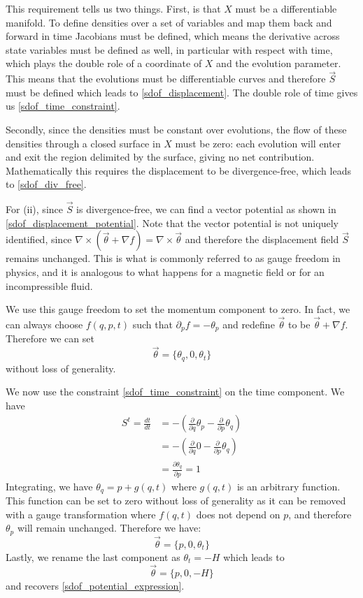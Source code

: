 \documentclass[10pt,twocolumn, nofootinbib]{revtex4-2}
\begin{document}
This requirement tells us two things. First, is that $X$ must be a differentiable manifold. To define densities over a set of variables and map them back and forward in time Jacobians must be defined, which means the derivative across state variables must be defined as well, in particular with respect with time, which plays the double role of a coordinate of $X$ and the evolution parameter. This means that the evolutions must be differentiable curves and therefore $\vec{S}$ must be defined which leads to \ref{sdof_displacement}. The double role of time gives us \ref{sdof_time_constraint}.

Secondly, since the densities must be constant over evolutions, the flow of these densities through a closed surface in $X$ must be zero: each evolution will enter and exit the region delimited by the surface, giving no net contribution. Mathematically this requires the displacement to be divergence-free, which leads to \ref{sdof_div_free}.

For (ii), since $\vec{S}$ is divergence-free, we can find a vector potential as shown in \ref{sdof_displacement_potential}. Note that the vector potential is not uniquely identified, since $\nabla \times(\vec{\theta} + \nabla f) = \nabla \times \vec{\theta}$ and therefore the displacement field $\vec{S}$ remains unchanged. This is what is commonly referred to as gauge freedom in physics, and it is analogous to what happens for a magnetic field or for an incompressible fluid.

We use this gauge freedom to set the momentum component to zero. In fact, we can always choose $f(q,p,t)$ such that $\partial_p f = -\theta_p$ and redefine $\vec{\theta}$ to be $\vec{\theta} + \nabla f$. Therefore we can set
\begin{equation*}
	\vec{\theta} = \{\theta_q, 0, \theta_t\}
\end{equation*}
without loss of generality.

We now use the constraint \ref{sdof_time_constraint} on the time component. We have
\begin{align*}
	S^t = \frac{dt}{dt} &= - \left(\frac{\partial}{\partial q}  \theta_p - \frac{\partial}{\partial p}  \theta_q\right) \\
	&= - \left(\frac{\partial}{\partial q}  0 - \frac{\partial}{\partial p}  \theta_q\right) \\
	& = \frac{\partial \theta_q}{\partial p} = 1
\end{align*}
Integrating, we have $\theta_q = p + g(q,t)$ where $g(q,t)$ is an arbitrary function. This function can be set to zero without loss of generality as it can be removed with a gauge transformation where $f(q,t)$ does not depend on $p$, and therefore $\theta_p$ will remain unchanged. Therefore we have:
\begin{equation*}
	\vec{\theta} = \{p, 0, \theta_t\}
\end{equation*}
Lastly, we rename the last component as $\theta_t = -H$ which leads to 
\begin{equation*}
	\vec{\theta} = \{p, 0, -H\}
\end{equation*}
and recovers \ref{sdof_potential_expression}.
\end{document}
